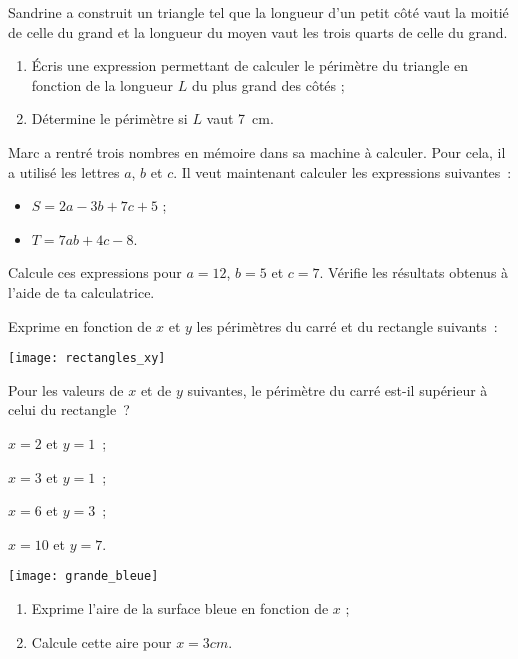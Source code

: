 \begin{exercice}
Sandrine a construit un triangle tel que la longueur d'un petit côté vaut la moitié de celle du grand et la longueur du moyen vaut les trois quarts de celle du grand.
\begin{enumerate}
 \item Écris une expression permettant de calculer le périmètre du triangle en fonction de la longueur $L$ du plus grand des côtés ;
 \item Détermine le périmètre si $L$ vaut 7 cm.
 \end{enumerate}
\end{exercice}


\begin{exercice}
Marc a rentré trois nombres en mémoire dans sa machine à calculer. Pour cela, il a utilisé les lettres $a$, $b$ et $c$. Il veut maintenant calculer les expressions suivantes :
\begin{itemize}
 \item $S = 2a - 3b + 7c + 5$ ;
 \item $T = 7ab + 4c - 8$.
 \end{itemize}
Calcule ces expressions pour $a = 12$, $b = 5$ et $c = 7$. Vérifie les résultats obtenus à l'aide de ta calculatrice.
\end{exercice}


\begin{exercice}
Exprime en fonction de $x$ et $y$ les périmètres du carré et du rectangle suivants :
\begin{center} \texttt{[image: rectangles\_xy]} \end{center} 
Pour les valeurs de $x$ et de $y$ suivantes, le périmètre du carré est-il supérieur à celui du rectangle ?
\begin{colenumerate}{2}
 \item $x = 2$ et $y = 1$ ; 
 \item $x = 3$ et $y = 1$ ; 
 \item $x = 6$ et $y = 3$ ; 
 \item $x = 10$ et $y = 7$.
 \end{colenumerate}
\end{exercice}


\begin{exercice}
\begin{center} \texttt{[image: grande\_bleue]} \end{center}
\begin{enumerate}
 \item Exprime l'aire de la surface bleue en fonction de $x$ ;
 \item Calcule cette aire pour $x = 3 cm$.
 \end{enumerate}
\end{exercice}


